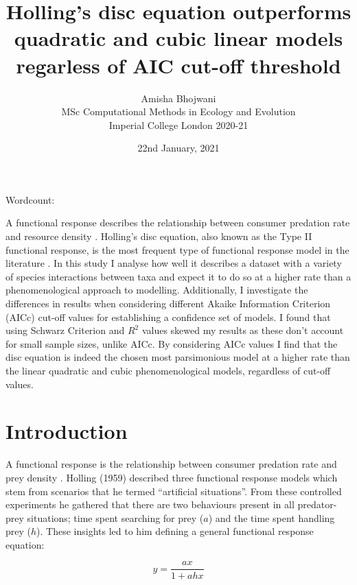 \documentclass[11pt]{article}
\title{\textbf \huge Holling's disc equation outperforms quadratic and cubic linear models regarless of AIC cut-off threshold}
\author{ \large Amisha Bhojwani \\ \small MSc Computational Methods in Ecology and Evolution \\ \small Imperial College London 2020-21 \\}
\date{ \small 22nd January, 2021}
\newcommand\wordcount{}
\begin{document}
  
  \begin{titlepage}
    \centering
    \maketitle
    \normalsize
    Wordcount: \wordcount{}
  \end{titlepage}
  
  \tableofcontents{}
  \pagebreak
  
  \abstract
  A functional response describes the relationship between consumer predation rate and resource density \cite{Solomon1949}. Holling’s disc equation, also known as the Type II functional response, is the most frequent type of functional response model in the literature \cite{Jeschke2002}. In this study I analyse how well it describes a dataset with a variety of species interactions between taxa and expect it to do so at a higher rate than a phenomenological approach to modelling. Additionally, I investigate the differences in results when considering different Akaike Information Criterion (AICc) cut-off values for establishing a confidence set of models. I found that using Schwarz Criterion and $R^2$ values skewed my results as these don’t account for small sample sizes, unlike AICc. By considering AICc values I find that the disc equation is indeed the chosen most parsimonious model at a higher rate than the linear quadratic and cubic phenomenological models, regardless of cut-off values.
  
  \section{Introduction}
  
  A functional response is the relationship between consumer predation rate and prey density \cite{Solomon1949}. Holling (1959) \cite{Holling1959} described three functional response models which stem from scenarios that he termed “artificial situations”. From these controlled experiments he gathered that there are two behaviours present in all predator-prey situations; time spent searching for prey ($a$) and the time spent handling prey ($h$). These insights led to him defining a general functional response equation:
  
  \begin{linenomath*}
    \begin{equation}
      y=\frac{ax}{1+ahx}\label{eq:1}
    \end{equation}
  \end{linenomath*}
  
\end{document}
